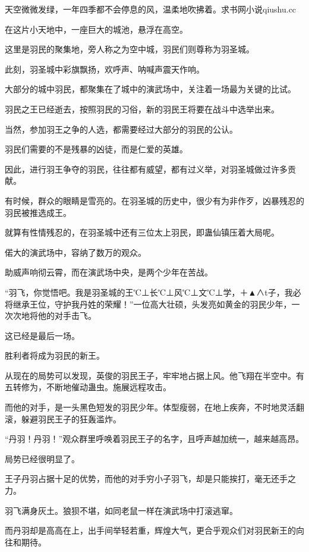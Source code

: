 
\begin{this_body}

天空微微发绿，一年四季都不会停息的风，温柔地吹拂着。求书网小说qiushu.cc

在这片小天地中，一座巨大的城池，悬浮在高空。

这里是羽民的聚集地，旁人称之为空中城，羽民们则尊称为羽圣城。

此刻，羽圣城中彩旗飘扬，欢呼声、呐喊声震天作响。

大部分的城中羽民，都聚集在了城中的演武场中，关注着一场最为关键的比试。

羽民之王已经逝去，按照羽民的习俗，新的羽民王将要在战斗中选举出来。

当然，参加羽王之争的人选，都需要经过大部分的羽民的公认。

羽民们需要的不是残暴的凶徒，而是仁爱的英雄。

因此，进行羽王争夺的羽民，往往都有威望，都有过义举，对羽圣城做过许多贡献。

有时候，群众的眼睛是雪亮的。在羽圣城的历史中，很少有为非作歹，凶暴残忍的羽民被推选成王。

就算有性情残忍的，在羽圣城中还有三位太上羽民，即蛊仙镇压着大局呢。

偌大的演武场中，容纳了数万的观众。

助威声响彻云霄，而在演武场中央，是两个少年在苦战。

“羽飞，你觉悟吧。我是羽圣城的王℃⊥长℃⊥风℃⊥文℃⊥学，＋▲∧t子，我必将继承王位，守护我丹姓的荣耀！”一位高大壮硕，头发亮如黄金的羽民少年，一次次地将他的对手击飞。

这已经是最后一场。

胜利者将成为羽民的新王。

从现在的局势可以发现，英俊的羽民王子，牢牢地占据上风。他飞翔在半空中。有五转修为，不断地催动蛊虫。施展远程攻击。

而他的对手，是一头黑色短发的羽民少年。体型瘦弱，在地上疾奔，不时地灵活翻滚，躲避羽民王子的狂轰滥炸。

“丹羽！丹羽！”观众群里呼唤着羽民王子的名字，且呼声越加统一，越来越高昂。

局势已经很明显了。

王子丹羽占据十足的优势，而他的对手穷小子羽飞，却是只能挨打，毫无还手之力。

羽飞满身灰土。狼狈不堪，如同老鼠一样在演武场中打滚逃窜。

而丹羽却是高高在上，出手间举轻若重，辉煌大气，更合乎观众们对羽民新王的向往和期待。


\end{this_body}
